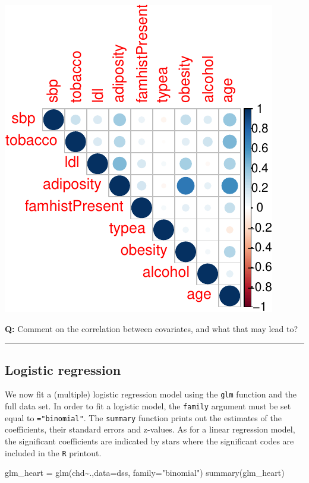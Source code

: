 \documentclass[
  letterpaper,
  DIV=11,
  numbers=noendperiod]{scrartcl}
\newenvironment{Shaded}{\begin{snugshade}}{\end{snugshade}}
\newcommand{\AttributeTok}[1]{\textcolor[rgb]{0.40,0.45,0.13}{#1}}
\newcommand{\FunctionTok}[1]{\textcolor[rgb]{0.28,0.35,0.67}{#1}}
\newcommand{\NormalTok}[1]{\textcolor[rgb]{0.00,0.23,0.31}{#1}}
\newcommand{\OtherTok}[1]{\textcolor[rgb]{0.00,0.23,0.31}{#1}}
\newcommand{\SpecialCharTok}[1]{\textcolor[rgb]{0.37,0.37,0.37}{#1}}
\newcommand{\StringTok}[1]{\textcolor[rgb]{0.13,0.47,0.30}{#1}}
\begin{document}
\includegraphics{L10_files/figure-pdf/unnamed-chunk-6-2.pdf}

\textbf{Q:} Comment on the correlation between covariates, and what that
may lead to?

\begin{center}\rule{0.5\linewidth}{0.5pt}\end{center}

\hypertarget{logistic-regression}{%
\subsection{Logistic regression}\label{logistic-regression}}

We now fit a (multiple) logistic regression model using the \texttt{glm}
function and the full data set. In order to fit a logistic model, the
\texttt{family} argument must be set equal to \texttt{="binomial"}. The
\texttt{summary} function prints out the estimates of the coefficients,
their standard errors and z-values. As for a linear regression model,
the significant coefficients are indicated by stars where the
significant codes are included in the \texttt{R} printout.

\begin{Shaded}
\begin{Highlighting}[]
\NormalTok{glm\_heart }\OtherTok{=} \FunctionTok{glm}\NormalTok{(chd}\SpecialCharTok{\textasciitilde{}}\NormalTok{.,}\AttributeTok{data=}\NormalTok{dss, }\AttributeTok{family=}\StringTok{"binomial"}\NormalTok{)}
\FunctionTok{summary}\NormalTok{(glm\_heart)}
\end{Highlighting}
\end{Shaded}
\end{document}

